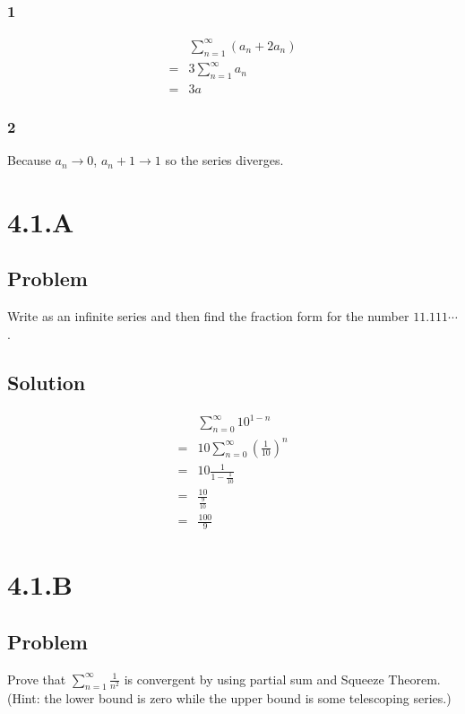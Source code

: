\documentclass[12pt]{article}
\newcommand{\round}[1]{\left(       #1 \right)      }
\begin{document}
\subsubsection*{1}
\begin{align*}
     & \sum_{n=1}^\infty (a_n + 2a_n) \\
    =& 3 \sum_{n=1}^\infty a_n \\
    =& 3a
\end{align*}

\subsubsection*{2}
Because $a_n \to 0$, $a_n + 1 \to 1$ so the series diverges.



\section*{4.1.A}

\subsection*{Problem}
Write as an infinite series and then find the fraction form for the number $11.111\cdots$.

\subsection*{Solution}
\begin{align*}
     & \sum_{n=0}^\infty 10^{1-n} \\
    =& 10 \sum_{n=0}^\infty \round{\frac{1}{10}}^n \\
    =& 10 \frac{1}{1 - \frac{1}{10}} \\
    =& \frac{10}{\frac{9}{10}} \\
    =& \frac{100}{9}
\end{align*}



\section*{4.1.B}

\subsection*{Problem}
Prove that $\sum_{n=1}^\infty \frac{1}{n^2}$ is convergent by using partial sum and Squeeze Theorem. (Hint: the lower bound is zero while the upper bound is some telescoping series.)
\end{document}
